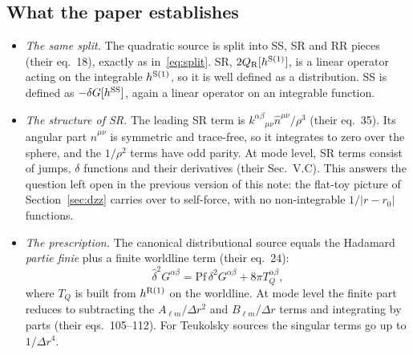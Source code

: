 \documentclass[11pt,a4paper]{article}
\begin{document}
\subsection{What the paper establishes}
\begin{itemize}[nosep]
\item \emph{The same split.}
  The quadratic source is split into SS, SR and RR pieces (their eq.~18), exactly as in~\eqref{eq:split}.
  SR, $2Q_{\rm R}[h^{\rm S(1)}]$, is a linear operator acting on the integrable $h^{\rm S(1)}$, so it is well defined as a distribution.
  SS is defined as $-\delta G[h^{\rm SS}]$, again a linear operator on an integrable function.
\item \emph{The structure of SR.}
  The leading SR term is $k^{\alpha\beta}{}_{\mu\nu}\hat n^{\mu\nu}/\rho^3$ (their eq.~35). Its angular part $\hat n^{\mu\nu}$ is symmetric and trace-free, so it integrates to zero over the sphere, and the $1/\rho^2$ terms have odd parity.
  At mode level, SR terms consist of jumps, $\delta$ functions and their derivatives (their Sec.~V.C).
  This answers the question left open in the previous version of this note: the flat-toy picture of Section~\ref{sec:dzz} carries over to self-force, with no non-integrable $1/|r-r_0|$ functions.
\item \emph{The prescription.}
  The canonical distributional source equals the Hadamard \emph{partie finie} plus a finite worldline term (their eq.~24):
  \begin{equation}
  \hat\delta^2G^{\alpha\beta}=\mathrm{Pf}\,\delta^2G^{\alpha\beta}+8\pi T^{\alpha\beta}_Q,
  \end{equation}
  where $T_Q$ is built from $h^{\rm R(1)}$ on the worldline.
  At mode level the finite part reduces to subtracting the $A_{\ell m}/\Delta r^2$ and $B_{\ell m}/\Delta r$ terms and integrating by parts (their eqs.~105--112).
  For Teukolsky sources the singular terms go up to $1/\Delta r^4$.
\end{itemize}
\end{document}
